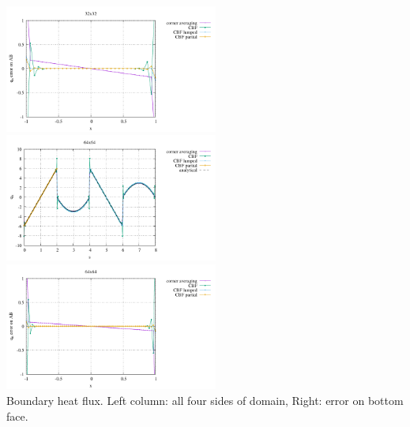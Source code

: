 \begin{center}
\includegraphics[width=7cm]{python_codes/fieldstone_173/results/exp5/heat_flux_boundary_bottom_32.pdf}\\
\includegraphics[width=7cm]{python_codes/fieldstone_173/results/exp5/heat_flux_boundary_64.pdf}
\includegraphics[width=7cm]{python_codes/fieldstone_173/results/exp5/heat_flux_boundary_bottom_64.pdf}\\
{\captionfont Boundary heat flux. Left column: all four sides of domain, Right: error on bottom face.}
\end{center}




